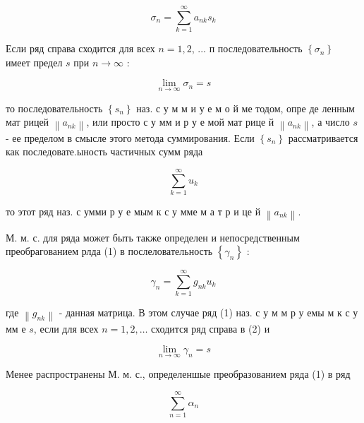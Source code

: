 \documentclass[10pt]{article}
\begin{document}
\[

\sigma_{n}=\sum_{k=1}^{\infty} a_{n k} s_{k}

\]



Если ряд справа сходится для всех $n=1,2$, ... п последовательность $\left\{\sigma_{n}\right\}$ имеет предел $s$ при $n \rightarrow \infty$ :



\[

\lim _{n \rightarrow \infty} \sigma_{n}=s

\]



то последовательность $\left\{s_{n}\right\}$ наз. с у м м и у е м о й ме тодом, опре де ленным мат рицей $\left\|a_{n k}\right\|$, или просто с у мм и р у е мой мат рице й $\left\|a_{n k}\right\|$, а число $s$ - ее пределом в смысле этого метода суммирования. Если $\left\{s_{n}\right\}$ рассматривается как последовате.ыность частичных сумм ряда



\[

\sum_{k=1}^{\infty} u_{k}

\]



то этот ряд наз. с умми р у е мым к с у мме м а т р и це й $\left\|a_{n k}\right\|$.



М. м. с. для ряда может быть также определен и непосредственным преобрагованием рлда (1) в послеловательность $\left\{\gamma_{n}\right\}$ :



\[

\gamma_{n}=\sum_{k=1}^{\infty} g_{n k} u_{k}

\]



где $\left\|g_{n k}\right\|$ - данная матрица. В этом случае ряд (1) наз. с у м м р у емы м к с у мм е $s$, если для всех $n=1,2, \ldots$ сходится ряд справа в (2) и



\[

\lim _{n \rightarrow \infty} \gamma_{n}=s

\]



Менее распространены М. м. с., определеншые преобразованием ряда (1) в ряд



\[

\sum_{n=1}^{\infty} \alpha_{n}

\]
\end{document}
